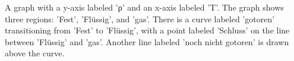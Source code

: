 A graph with a y-axis labeled 'ρ' and an x-axis labeled 'T'. The graph shows three regions: 'Fest', 'Flüssig', and 'gas'. There is a curve labeled 'gotoren' transitioning from 'Fest' to 'Flüssig', with a point labeled 'Schluss' on the line between 'Flüssig' and 'gas'. Another line labeled 'noch nicht gotoren' is drawn above the curve.